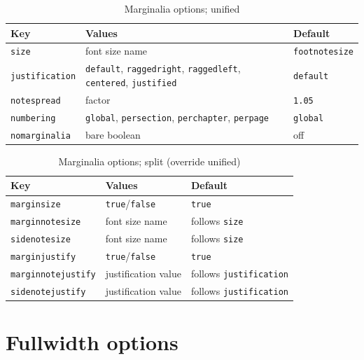 \documentclass[11pt, twoside, openany]{book}
\begin{document}
\begin{table}[h]
	\caption{Marginalia options; unified}
	\label{tab:marginaliaunifiedselection}
	\centering
	\begin{tabular}{lll}
		\textbf{Key}          & \textbf{Values} & \textbf{Default}      \\
		\hline
		\texttt{size}         & font size name  & \texttt{footnotesize} \\
		\texttt{justification} & \texttt{default}, \texttt{raggedright},
		\texttt{raggedleft}, \texttt{centered}, \texttt{justified}
		& \texttt{default} \\
		\texttt{notespread}   & factor          & \texttt{1.05}         \\
		\texttt{numbering}     & \texttt{global}, \texttt{persection},
		\texttt{perchapter}, \texttt{perpage}
		& \texttt{global} \\
		\texttt{nomarginalia} & bare boolean    & off                   \\
	\end{tabular}
\end{table}


\begin{table}[h]
	\caption{Marginalia options; split (override unified)}
	\label{tab:marginaliasplitselection}
	\centering
	\begin{tabular}{lll}
		\textbf{Key}               & \textbf{Values}              & \textbf{Default}               \\
		\hline
		\texttt{marginsize}        & \texttt{true}/\texttt{false} & \texttt{true}                  \\
		\texttt{marginnotesize}    & font size name               & follows \texttt{size}          \\
		\texttt{sidenotesize}      & font size name               & follows \texttt{size}          \\
		\texttt{marginjustify}     & \texttt{true}/\texttt{false} & \texttt{true}                  \\
		\texttt{marginnotejustify} & justification value          & follows \texttt{justification} \\
		\texttt{sidenotejustify}   & justification value          & follows \texttt{justification} \\
	\end{tabular}
\end{table}

\section{Fullwidth options}\label{sec:fulloptions}
\end{document}
